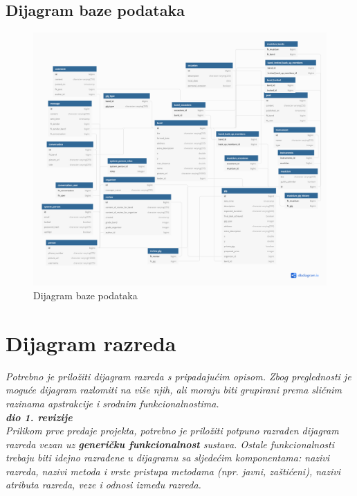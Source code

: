 		
	

			
			\subsection{Dijagram baze podataka}
			
			\begin{figure}[H]
			\begin{center}
				\includegraphics[width=17cm]{slike/ERModel.PNG}
			\end{center}
			\caption{Dijagram baze podataka}
			\label{fig:dijagramBaze}
		\end{figure}
			
			
			
		\section{Dijagram razreda}
		
			\textit{Potrebno je priložiti dijagram razreda s pripadajućim opisom. Zbog preglednosti je moguće dijagram razlomiti na više njih, ali moraju biti grupirani prema sličnim razinama apstrakcije i srodnim funkcionalnostima.}\\
			
			\textbf{\textit{dio 1. revizije}}\\
			
			\textit{Prilikom prve predaje projekta, potrebno je priložiti potpuno razrađen dijagram razreda vezan uz \textbf{generičku funkcionalnost} sustava. Ostale funkcionalnosti trebaju biti idejno razrađene u dijagramu sa sljedećim komponentama: nazivi razreda, nazivi metoda i vrste pristupa metodama (npr. javni, zaštićeni), nazivi atributa razreda, veze i odnosi između razreda.}\\
			
